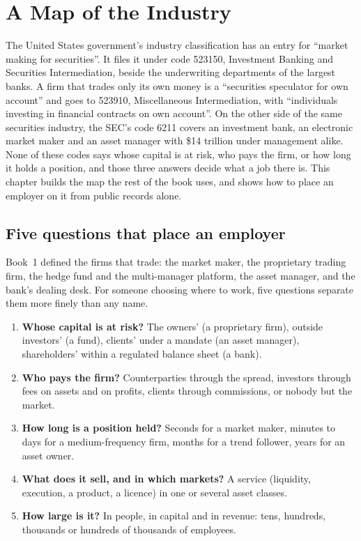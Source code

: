 \chapter{A Map of the Industry}\label{ch:in:a-map-of-the-industry}

The United States government's industry classification has an entry for ``market making for securities''. It files it
under code 523150, Investment Banking and Securities Intermediation, beside the underwriting departments of the largest
banks. A firm that trades only its own money is a ``securities speculator for own account'' and goes to 523910,
Miscellaneous Intermediation, with ``individuals investing in financial contracts on own account''. On the other side of
the same securities industry, the SEC's code 6211 covers an investment bank, an electronic market maker and an asset
manager with \$14 trillion under management alike. None of these codes says whose capital is at risk, who pays the firm, or how long
it holds a position, and those three answers decide what a job there is. This chapter builds the map the rest of the
book uses, and shows how to place an employer on it from public records alone.

\section{Five questions that place an employer}

Book~1 defined the firms that trade: the market maker, the proprietary trading firm, the hedge fund and the
multi-manager platform, the asset manager, and the bank's dealing desk. For someone choosing where to work, five
questions separate them more finely than any name.

\begin{enumerate}
\item \textbf{Whose capital is at risk?} The owners' (a proprietary firm), outside investors' (a fund), clients' under
a mandate (an asset manager), shareholders' within a regulated balance sheet (a bank).
\item \textbf{Who pays the firm?} Counterparties through the spread, investors through fees on assets and on profits,
clients through commissions, or nobody but the market.
\item \textbf{How long is a position held?} Seconds for a market maker, minutes to days for a medium-frequency firm,
months for a trend follower, years for an asset owner.
\item \textbf{What does it sell, and in which markets?} A service (liquidity, execution, a product, a licence) in one or
several asset classes.
\item \textbf{How large is it?} In people, in capital and in revenue: tens, hundreds, thousands or hundreds of thousands
of employees.
\end{enumerate}


